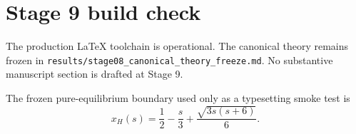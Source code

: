\section{Stage 9 build check}

The production \LaTeX{} toolchain is operational. The canonical theory remains frozen in
\texttt{results/stage08\_canonical\_theory\_freeze.md}. No substantive manuscript section is drafted at Stage 9.

The frozen pure-equilibrium boundary used only as a typesetting smoke test is
\[
x_H(s)=\frac12-\frac{s}{3}+\frac{\sqrt{3s(s+6)}}6.
\]
